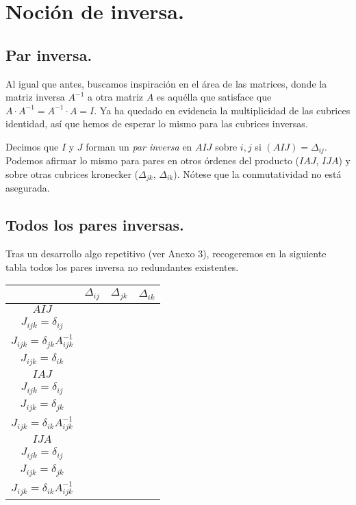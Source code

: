 \section{Noción de inversa.}

\subsection{Par inversa.}

Al igual que antes, buscamos inspiración en el área de las matrices, donde la matriz inversa $A^{-1}$ a otra matriz $A$ es aquélla que satisface que ${A\cdot A^{-1} = A^{-1} \cdot A = I}$. Ya ha quedado en evidencia la multiplicidad de las cubrices identidad, así que hemos de esperar lo mismo para las cubrices inversas.

Decimos que $I$ y $J$ forman un \textit{par inversa} en $AIJ$ sobre $i, j$ si $(AIJ) = \Delta_{ij}$. Podemos afirmar lo mismo para pares en otros órdenes del producto ($IAJ$, $IJA$) y sobre otras cubrices kronecker ($\Delta_{jk}$, $\Delta_{ik}$). Nótese que la conmutatividad no está asegurada.

\subsection{Todos los pares inversas.}

Tras un desarrollo algo repetitivo (ver Anexo 3), recogeremos en la siguiente tabla todos los pares inversa no redundantes existentes.

\vspace{0.5cm}

\begin{tabular}{ |c|c|c|c| } 
	\hline
		  & $\Delta_{ij}$      & $\Delta_{jk}$       & $\Delta_{ik}$ \\
	\hline
	$AIJ$ & \makecell{$I_{ijk} = \delta_{ij} A_{ijk}^{-1}$ \\ $J_{ijk} = \delta_{ij}$}                          & \makecell{$I_{ijk} = \delta_{jk}$ \\ $J_{ijk} = \delta_{jk} A_{ijk}^{-1}$}                          & \makecell{$I_{ijk} = \delta_{ik} A_{kkk}^{-1}$ \\ $J_{ijk} = \delta_{ik}$} \\
	\hline
	$IAJ$ & \makecell{$I_{ijk} = \delta_{ij} A_{ijk}^{-1}$ \\ $J_{ijk} = \delta_{ij}$}                          & \makecell{$I_{ijk} = \delta_{jk} A_{jjj}^{-1}$ \\ $J_{ijk} = \delta_{jk}$} & \makecell{$I_{ijk} = \delta_{ik}$ \\ $J_{ijk} = \delta_{ik} A_{ijk}^{-1}$} \\
	\hline
	$IJA$ & \makecell{$I_{ijk} = \delta_{ij} A_{iii}^{-1}$ \\ $J_{ijk} = \delta_{ij}$} & \makecell{$I_{ijk} = \delta_{jk} A_{ijk}^{-1}$ \\ $J_{ijk} = \delta_{jk}$}                          & \makecell{$I_{ijk} = \delta_{ik}$ \\ $J_{ijk} = \delta_{ik} A_{ijk}^{-1}$} \\
	\hline
\end{tabular}

